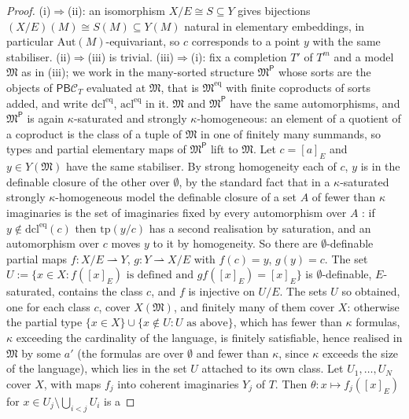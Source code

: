 \documentclass[11pt]{amsart}
\theoremstyle{definition}
\newcommand{\PP}{\mathsf P}
\newcommand{\BB}{\mathsf B}
\newcommand{\cC}{\mathcal C}
\begin{document}
\begin{proof}
(i)$\Rightarrow$(ii): an isomorphism $X/E\cong S\subseteq Y$ gives
bijections $(X/E)(M)\cong S(M)\subseteq Y(M)$ natural in elementary
embeddings, in particular $\mathrm{Aut}(M)$-equivariant, so $c$
corresponds to a point $y$ with the same stabiliser.
(ii)$\Rightarrow$(iii) is trivial.
(iii)$\Rightarrow$(i): fix a completion $T'$ of $T^m$ and a model
$\mathfrak M$ as in (iii); we work in the many-sorted structure
$\mathfrak M^{\PP}$ whose sorts are the objects of $\PP\BB\cC_T$
evaluated at $\mathfrak M$, that is $\mathfrak M^{\mathrm{eq}}$ with
finite coproducts of sorts added, and write $\mathrm{dcl}^{\mathrm{eq}}$,
$\mathrm{acl}^{\mathrm{eq}}$ in it. $\mathfrak M$ and $\mathfrak M^{\PP}$
have the same automorphisms, and $\mathfrak M^{\PP}$ is again
$\kappa$-saturated and strongly $\kappa$-homogeneous: an element of a
quotient of a coproduct is the class of a tuple of $\mathfrak M$ in one
of finitely many summands, so types and partial elementary maps of
$\mathfrak M^{\PP}$ lift to $\mathfrak M$. Let $c=[a]_E$ and $y\in Y(\mathfrak
M)$ have the same stabiliser. By strong homogeneity each of $c$, $y$ is
in the definable closure of the other over $\emptyset$, by the
standard fact that in a $\kappa$-saturated strongly $\kappa$-homogeneous
model the definable closure of a set $A$ of fewer than $\kappa$
imaginaries is the set of imaginaries fixed by every automorphism over
$A$ \cite[Ch.~16]{Poizat00}: if $y\notin\mathrm{dcl}^{\mathrm{eq}}(c)$
then $\mathrm{tp}(y/c)$ has a second realisation by saturation, and an
automorphism over $c$ moves $y$ to it by homogeneity. So there are
$\emptyset$-definable partial maps
$f\colon X/E\rightharpoonup Y$, $g\colon Y\rightharpoonup X/E$ with
$f(c)=y$, $g(y)=c$. The set $U:=\{x\in X: f([x]_E)\text{ is defined and }
gf([x]_E)=[x]_E\}$ is $\emptyset$-definable, $E$-saturated, contains
the class $c$, and $f$ is injective on $U/E$. The sets $U$ so obtained,
one for each class $c$, cover $X(\mathfrak M)$, and finitely many of
them cover $X$: otherwise the partial type $\{x\in X\}\cup\{x\notin U:
U\text{ as above}\}$, which has fewer than $\kappa$ formulas, $\kappa$
exceeding the cardinality of the language, is finitely satisfiable,
hence realised in $\mathfrak M$ by some $a'$ (the formulas are over
$\emptyset$ and fewer than $\kappa$, since $\kappa$ exceeds the size of
the language), which lies in the set $U$ attached to its own class. Let $U_1,\dots,U_N$ cover $X$, with maps
$f_j$ into coherent imaginaries $Y_j$ of $T$. Then $\theta\colon
x\mapsto f_j([x]_E)$ for $x\in U_j\setminus\bigcup_{i<j}U_i$ is a

\end{proof}
\end{document}

